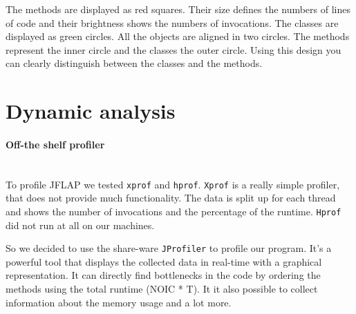 \documentclass{paper}
\begin{document}
The methods are displayed as red squares. Their size defines the numbers of lines of code and their brightness shows the numbers of invocations. The classes are displayed as green circles. All the objects are aligned in two circles. The methods represent the inner circle and the classes the outer circle. Using this design you can clearly distinguish between the classes and the methods.

\section{Dynamic analysis}


\paragraph{Off-the shelf profiler}\mbox{}\vspace{10pt}\\
To profile JFLAP we tested \texttt{xprof} and \texttt{hprof}. \texttt{Xprof} is a really simple profiler, that does not provide much functionality. The data is split up for each thread and shows the number of invocations and the percentage of the runtime. \texttt{Hprof} did not run at all on our machines.

So we decided to use the share-ware \texttt{JProfiler} to profile our program. It's a powerful tool that displays the collected data in real-time with a graphical representation. It can directly find bottlenecks in the code by ordering the methods using the total runtime (NOIC * T). It it also possible to collect information about the memory usage and a lot more.
\end{document}
